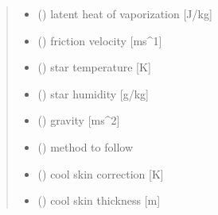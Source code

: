 \documentclass[letterpaper,10pt,english]{sphinxmanual}
\begin{document}
\begin{fulllineitems}
\begin{quote}
\begin{description}
\begin{itemize}
\item {}
\sphinxAtStartPar
{} () \textendash{} latent heat of vaporization   {[}J/kg{]}

\item {}
\sphinxAtStartPar
{} () \textendash{} friction velocity             {[}ms\textasciicircum{}\sphinxhyphen{}1{]}

\item {}
\sphinxAtStartPar
{} () \textendash{} star temperature              {[}K{]}

\item {}
\sphinxAtStartPar
{} () \textendash{} star humidity                 {[}g/kg{]}

\item {}
\sphinxAtStartPar
{} () \textendash{} gravity                      {[}ms\textasciicircum{}\sphinxhyphen{}2{]}

\item {}
\sphinxAtStartPar
{} () \textendash{} method to follow

\end{itemize}

\sphinxAtStartPar
\begin{itemize}
\item {}
\sphinxAtStartPar
{} () \textendash{} cool skin correction         {[}K{]}

\item {}
\sphinxAtStartPar
{} () \textendash{} cool skin thickness           {[}m{]}

\end{itemize}


\end{description}\end{quote}

\end{fulllineitems}

\end{document}
